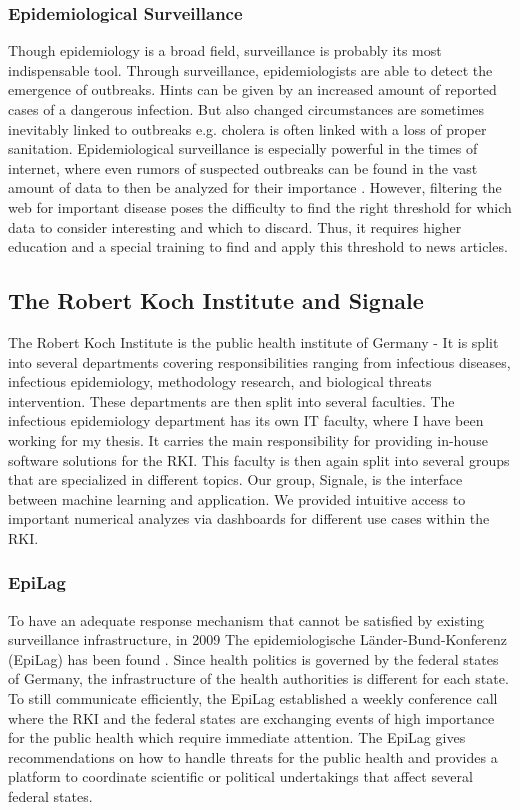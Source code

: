 \subsubsection{Epidemiological Surveillance}

Though epidemiology is a broad field, surveillance is probably its most indispensable tool. Through surveillance,
epidemiologists are able to detect the emergence of outbreaks. Hints can be given by an increased amount of reported cases of a dangerous infection. But also changed circumstances are sometimes inevitably linked to outbreaks e.g. cholera is often linked with a loss of proper sanitation. Epidemiological surveillance is especially powerful in the times of internet, where even rumors of suspected outbreaks can be found in the vast amount of data to then be analyzed for their importance \cite{EpiSurv}. However, filtering the web for important disease poses the difficulty to find the right threshold for which data to consider interesting and which to discard. Thus, it requires higher education and a special training to find and apply this threshold to
news articles.

\subsection{The Robert Koch Institute and Signale}
The Robert Koch Institute is the public health institute of Germany - It is
split into several departments covering responsibilities ranging from infectious diseases, infectious epidemiology, methodology research, and biological threats intervention.
These departments are then split into several faculties. The infectious epidemiology department has its own IT faculty,
where I have been working for my thesis. It carries the main responsibility for providing in-house software solutions for the RKI. This faculty is then again split into several groups that are specialized in different topics.
Our group, Signale, is the interface between machine learning and application.
We provided intuitive access to important numerical analyzes via dashboards for different use cases within the RKI.

\subsubsection{EpiLag}
To have an adequate response mechanism that cannot be satisfied by existing surveillance infrastructure, in 2009 The epidemiologische L\"ander-Bund-Konferenz (\gls{EpiLag}) has been found \cite{EpiLag}. Since health politics is governed by the federal states of Germany, the infrastructure of the health authorities is different for each state. To still communicate efficiently, the EpiLag established a weekly conference call where the RKI and the federal states are exchanging events of high importance for the public health which require immediate attention. The EpiLag gives recommendations on how to handle threats for the public health and provides a platform to coordinate scientific or political undertakings that affect several federal states.


